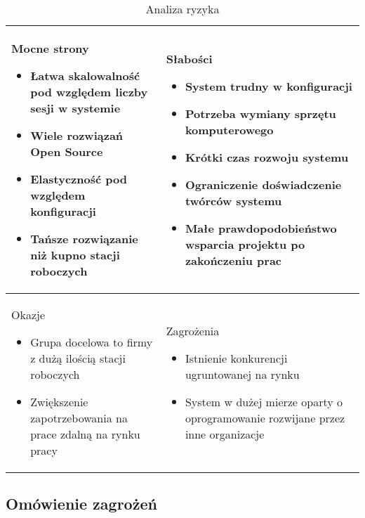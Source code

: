 \documentclass[../wstep.tex]{subfiles}
\begin{document}
\begin{table}[H]
    \caption[Analiza ryzyka]{Analiza ryzyka}
    \label{risk-analysis}
    \centering
    \begin{tabular}{| p{} | p{} |}
        \hline
        Mocne strony
        \begin{itemize}
            \item Łatwa skalowalność pod względem liczby sesji w systemie
            \item Wiele rozwiązań Open Source
            \item Elastyczność pod względem konfiguracji
            \item Tańsze rozwiązanie niż kupno stacji roboczych
        \end{itemize}
         &
        Słabości
        \begin{itemize}
            \item System trudny w konfiguracji
            \item Potrzeba wymiany sprzętu komputerowego
            \item Krótki czas rozwoju systemu
            \item Ograniczenie doświadczenie twórców systemu
            \item Małe prawdopodobieństwo wsparcia projektu po zakończeniu prac
        \end{itemize}
        \\ \hline

        Okazje
        \begin{itemize}
            \item Grupa docelowa to firmy z dużą ilością stacji roboczych
            \item Zwiększenie zapotrzebowania na prace zdalną na rynku pracy
        \end{itemize}
         &

        Zagrożenia
        \begin{itemize}
            \item Istnienie konkurencji ugruntowanej na rynku
            \item System w dużej mierze oparty o oprogramowanie rozwijane przez inne organizacje
        \end{itemize}
        \\ \hline
    \end{tabular}
\end{table}

\subsection{Omówienie zagrożeń}
\end{document}
